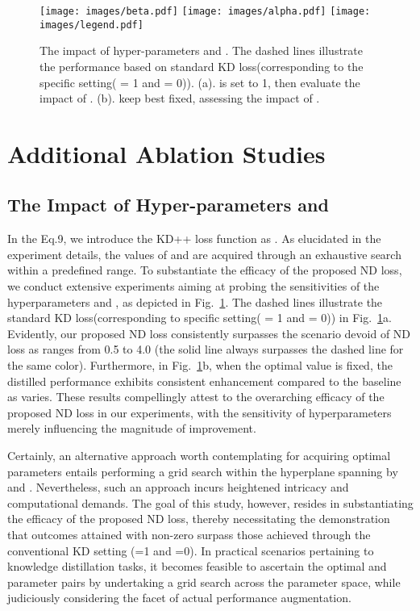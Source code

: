 \documentclass{article}
\begin{document}
\begin{figure}[h]
\centering
    {\texttt{[image: images/beta.pdf]}}
    \hfill
    {\texttt{[image: images/alpha.pdf]}}
    \hfill
    \texttt{[image: images/legend.pdf]}

\caption{\small
The impact of hyper-parameters  and . The dashed lines illustrate the performance based on standard KD loss(corresponding to the specific setting( = 1 and  = 0)). (a).  is set to 1, then evaluate the impact of . (b). keep best  fixed, assessing the impact of .
}
\vspace{-2.0mm}
\label{fig:suppl_alpha_beta}
\end{figure} 
\section{Additional Ablation Studies}

\subsection{The Impact of Hyper-parameters  and }
In the Eq.9, we introduce the KD++ loss function as . As elucidated in the experiment details, the values of  and  are acquired through an exhaustive search within a predefined range. To substantiate the efficacy of the proposed ND loss, we conduct extensive experiments aiming at probing the sensitivities of the hyperparameters  and , as depicted in Fig.~\ref{fig:suppl_alpha_beta}. The dashed lines illustrate the standard KD loss(corresponding to specific setting( = 1 and  = 0)) in Fig.~\ref{fig:suppl_alpha_beta}a. Evidently, our proposed ND loss consistently surpasses the scenario devoid of ND loss as  ranges from 0.5 to 4.0 (the solid line always surpasses the dashed line for the same color). Furthermore, in Fig.~\ref{fig:suppl_alpha_beta}b, when the optimal  value is fixed, the distilled performance exhibits consistent enhancement compared to the baseline as  varies. These results compellingly attest to the overarching efficacy of the proposed ND loss in our experiments, with the sensitivity of hyperparameters merely influencing the magnitude of improvement. 

Certainly, an alternative approach worth contemplating for acquiring optimal parameters entails performing a grid search within the hyperplane spanning by  and . Nevertheless, such an approach incurs heightened intricacy and computational demands. The goal of this study, however, resides in substantiating the efficacy of the proposed ND loss, thereby necessitating the demonstration that outcomes attained with non-zero  surpass those achieved through the conventional KD setting (=1 and =0). In practical scenarios pertaining to knowledge distillation tasks, it becomes feasible to ascertain the optimal  and  parameter pairs by undertaking a grid search across the  parameter space, while judiciously considering the facet of actual performance augmentation.
\end{document}
